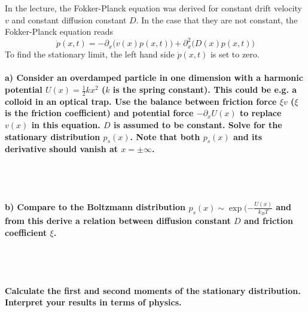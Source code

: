 In the lecture, the Fokker-Planck equation was derived for constant 
drift velocity $v$ and constant diffusion constant $D$. In the case 
that they are not constant, the Fokker-Planck equation reads
\begin{equation}
    \dot{p}(x,t)=-\partial_x\bigg(v(x)p(x,t)\bigg)+
    \partial_x^2\bigg(D(x)p(x,t)\bigg)
\end{equation}
To find the stationary limit, the left hand side $\dot p(x,t)$ is set 
to zero.

\paragraph{a) Consider an overdamped particle in one dimension with a 
    harmonic potential $U(x)=\frac{1}{2}kx^2$ ($k$ is the spring 
    constant). This could be e.g. a colloid in an optical trap. Use the 
    balance between friction force $\xi v$ ($\xi$ is the friction
    coefficient) and potential force $-\partial_xU(x)$ to replace 
    $v(x)$ in this equation. $D$ is assumed to be constant. Solve for 
    the stationary distribution $p_s(x)$. Note that both $p_s(x)$ and 
    its derivative should vanish at $x=\pm\infty$.
} \ \\
\\

\paragraph{b) Compare to the Boltzmann distribution 
    $p_s(x)\sim\exp(-\frac{U(x)}{k_BT}$ and from this derive a relation
    between diffusion constant $D$ and friction coefficient $\xi$.
} \ \\
\\

\paragraph{Calculate the first and second moments of the stationary
    distribution. Interpret your results in terms of physics.
} \ \\
\\

